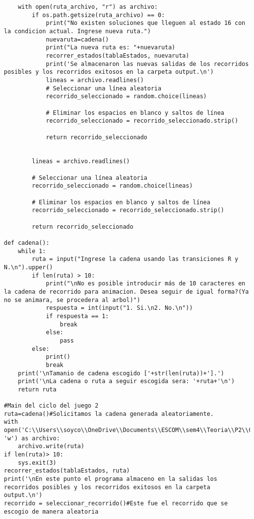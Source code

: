 \begin{enumerate}
\begin{lstlisting}
    with open(ruta_archivo, "r") as archivo:
        if os.path.getsize(ruta_archivo) == 0:
            print("No existen soluciones que lleguen al estado 16 con la condicion actual. Ingrese nueva ruta.")
            nuevaruta=cadena()
            print("La nueva ruta es: "+nuevaruta)
            recorrer_estados(tablaEstados, nuevaruta)
            print('Se almacenaron las nuevas salidas de los recorridos posibles y los recorridos exitosos en la carpeta output.\n')
            lineas = archivo.readlines()
            # Seleccionar una línea aleatoria
            recorrido_seleccionado = random.choice(lineas)
            
            # Eliminar los espacios en blanco y saltos de línea
            recorrido_seleccionado = recorrido_seleccionado.strip()
            
            return recorrido_seleccionado
        
            
        lineas = archivo.readlines()
        
        # Seleccionar una línea aleatoria
        recorrido_seleccionado = random.choice(lineas)
        
        # Eliminar los espacios en blanco y saltos de línea
        recorrido_seleccionado = recorrido_seleccionado.strip()
        
        return recorrido_seleccionado

def cadena():
    while 1:
        ruta = input("Ingrese la cadena usando las transiciones R y N.\n").upper()
        if len(ruta) > 10:
            print("\nNo es posible introducir más de 10 caracteres en la cadena de recorrido para animacion. Desea seguir de igual forma?(Ya no se animara, se procedera al arbol)")
            respuesta = int(input("1. Si.\n2. No.\n"))
            if respuesta == 1:
                break
            else:
                pass
        else:
            print()
            break
    print('\nTamanio de cadena escogido ['+str(len(ruta))+'].')
    print('\nLa cadena o ruta a seguir escogida sera: '+ruta+'\n')
    return ruta

#Main del ciclo del juego 2
ruta=cadena()#Solicitamos la cadena generada aleatoriamente.
with open('C:\\Users\\soyco\\OneDrive\\Documents\\ESCOM\\sem4\\Teoria\\P2\\Chess\\output\\ruta_blanca.txt', 'w') as archivo:
    archivo.write(ruta)
if len(ruta)> 10:
    sys.exit(3)    
recorrer_estados(tablaEstados, ruta)
print('\nEn este punto el programa almaceno en la salidas los recorridos posibles y los recorridos exitosos en la carpeta output.\n')
recorrido = seleccionar_recorrido()#Este fue el recorrido que se escogio de manera aleatoria


\end{lstlisting}
\end{enumerate}
